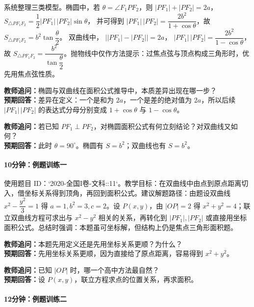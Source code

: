 \documentclass[UTF8,a4paper,11pt]{ctexart}
\begin{document}
系统整理三类模型。椭圆中，若 $\theta=\angle F_1PF_2$，则
$|PF_1|+|PF_2|=2a$，
$S_{\triangle PF_1F_2}=\dfrac12|PF_1|\,|PF_2|\sin\theta$，
并可得到 $|PF_1|\,|PF_2|=\dfrac{2b^2}{1+\cos\theta}$，故
$S_{\triangle PF_1F_2}=b^2\tan\dfrac\theta2$。
双曲线中，
$\bigl||PF_1|-|PF_2|\bigr|=2a$，
$|PF_1|\,|PF_2|=\dfrac{2b^2}{1-\cos\theta}$，故
$S_{\triangle PF_1F_2}=\dfrac{b^2}{\tan\dfrac\theta2}$。抛物线中仅作方法提示：过焦点弦与顶点构成三角形时，优先用焦点弦性质。

\noindent\textbf{教师追问：}椭圆与双曲线在面积公式推导中，本质差异出现在哪一步？\\

\textbf{预期回答：}差异在定义：一个是和为 $2a$，一个是差的绝对值为 $2a$，所以后续 $|PF_1|\,|PF_2|$ 的表达式分母分别变成 $1+\cos\theta$ 与 $1-\cos\theta$。\par

\noindent\textbf{教师追问：}若已知 $PF_1\perp PF_2$，对椭圆面积公式有何立刻结论？对双曲线又如何？\\

\textbf{预期回答：}此时 $\theta=90^\circ$。椭圆有 $S=b^2$；双曲线也有 $S=b^2$。\par

\paragraph{10分钟：例题训练一}

使用题目 ID：`2020-全国I卷-文科::11`。教学目标：在双曲线中由点到原点距离切入，借坐标关系得到顶角，再回到面积公式。建议解题路径：由题设双曲线 $x^2-\dfrac{y^2}{3}=1$ 得 $a=1,b^2=3,c=2$。设 $P(x,y)$，由 $|OP|=2$ 得 $x^2+y^2=4$；联立双曲线方程可求出与 $x^2-y^2$ 相关的关系，再转化到 $|PF_1|,|PF_2|$ 或直接用坐标面积公式。总结时强调：本题虽可坐标解，但结构上仍是焦点三角形面积题。

\noindent\textbf{教师追问：}本题先用定义还是先用坐标关系更顺？为什么？\\

\textbf{预期回答：}先用坐标关系更顺，因为直接给了原点距离，容易得到 $x^2+y^2$。\par

\noindent\textbf{教师追问：}已知 $|OP|$ 时，哪一个高中方法最自然？\\

\textbf{预期回答：}设 $P(x,y)$，联立方程求点的位置关系，再求面积。\par

\paragraph{12分钟：例题训练二}
\end{document}
